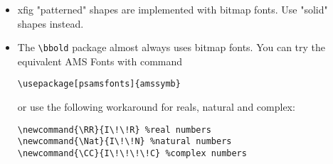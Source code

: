 \documentclass{article} %
\begin{document}
\begin{itemize}
\begin{itemize}
            \item xfig "patterned" shapes are implemented with
                  bitmap fonts.  Use "solid" shapes instead.
            \item The \verb+\bbold+ package almost always uses bitmap
                  fonts.  You can try the equivalent AMS Fonts with command
                  \begin{verbatim}
\usepackage[psamsfonts]{amssymb}
\end{verbatim}
                  or use the following workaround for reals, natural and complex:
                  \begin{verbatim}
\newcommand{\RR}{I\!\!R} %real numbers
\newcommand{\Nat}{I\!\!N} %natural numbers 
\newcommand{\CC}{I\!\!\!\!C} %complex numbers
\end{verbatim}


\end{itemize}
\end{itemize}
\end{document}
